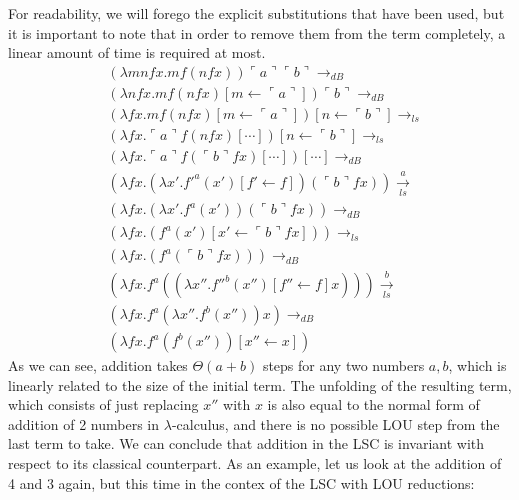 \documentclass[11pt]{article}
\begin{document}
For readability, we will forego the explicit substitutions that have been used, but it is important to note that in order to remove them from the term completely, a linear amount of time is required at most.
\begin{equation}
	\begin{split}
		& (\lambda mnfx.m f (n f x)) \ulcorner a \urcorner \ulcorner b \urcorner \rightarrow_{dB} \\
		& (\lambda nfx. m f (n f x )[m \leftarrow \ulcorner a \urcorner ]) \ulcorner b \urcorner \rightarrow_{dB} \\
		& (\lambda fx. mf (n f x)[m \leftarrow \ulcorner a \urcorner])[n \leftarrow \ulcorner b \urcorner] \rightarrow_{ls} \\
		& (\lambda fx. \ulcorner a \urcorner f (n f x)[\cdots])[n \leftarrow \ulcorner b \urcorner] \rightarrow_{ls} \\
		& (\lambda fx. \ulcorner a \urcorner f (\ulcorner b \urcorner f x)[\cdots])[\cdots] \rightarrow_{dB} \\
		& (\lambda fx.(\lambda x' .f'^a(x')[f'\leftarrow f])(\ulcorner b \urcorner f x)) \xrightarrow[ls]{a} \\
		& (\lambda fx. (\lambda x' .f^a(x')) (\ulcorner b \urcorner f x)) \rightarrow_{dB} \\
		& (\lambda fx. (f^a(x')[x' \leftarrow \ulcorner b \urcorner f x])) \rightarrow_{ls} \\
		& (\lambda fx. (f^a(\ulcorner b \urcorner f x))) \rightarrow_{dB} \\
		& (\lambda fx. f^a((\lambda x''.f''^b(x'')[f'' \leftarrow f]x))) \xrightarrow[ls]{b}\\
		& (\lambda fx. f^a(\lambda x''.f^b(x''))x) \rightarrow_{dB} \\
		& (\lambda fx. f^a(f^b(x''))[x'' \leftarrow x]) 
	\end{split}
\end{equation}
As we can see, addition takes $\Theta (a + b)$ steps for any two numbers $a, b$, which is linearly related to the size of the initial term. The unfolding of the resulting term, which consists of just replacing $x''$ with $x$ is also equal to the normal form of addition of 2 numbers in $\lambda$-calculus, and there is no possible LOU step from the last term to take. We can conclude that addition in the LSC is invariant with respect to its classical counterpart. As an example, let us look at the addition of 4 and 3 again, but this time in the contex of the LSC with LOU reductions:
\end{document}
